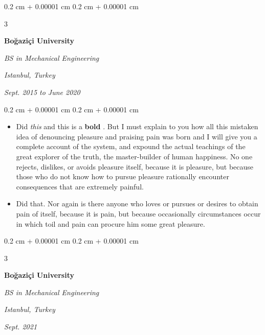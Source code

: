 \documentclass[10pt, letterpaper]{article}
\newenvironment{highlights}{
    \begin{itemize}[
        topsep=0.10 cm,
        parsep=0.10 cm,
        partopsep=0pt,
        itemsep=0pt,
        leftmargin=0.4 cm + 10pt + 0.6 cm
    ]
}{
    \end{itemize}
} %
\newenvironment{onecolentry}{
    \begin{adjustwidth}{
        0.2 cm + 0.00001 cm
    }{
        0.2 cm + 0.00001 cm
    }
}{
    \end{adjustwidth}
} %
\newenvironment{threecolentry}[3][]{
    \onecolentry
    \def\thirdColumn{#3}
    \setcolumnwidth{0.6 cm, \fill, 4.5 cm}
    \begin{paracol}{3}
    #2 \switchcolumn
}{
    \switchcolumn \raggedleft \thirdColumn
    \end{paracol}
    \endonecolentry
} %
\let\hrefWithoutArrow\href
\renewcommand{\href}[2]{\hrefWithoutArrow{#1}{\mbox{\ifthenelse{\equal{#2}{}}{ }{#2 }\raisebox{.15ex}{\footnotesize \faExternalLink*}}}}
\begin{document}
        \vspace{0.2 cm-3px}

        \begin{threecolentry}{
            \vspace*{\fill}
            \textbullet
            \vspace*{3px}
            \vspace*{\fill}
        }{
        \textit{Istanbul, Turkey}    
            
        \textit{Sept. 2015 to June 2020}}
            \textbf{Boğaziçi University}

            \textit{BS in Mechanical Engineering}
        \end{threecolentry}

        \vspace{0.10 cm-3px}
        \begin{onecolentry}
            \begin{highlights}
                \item Did \textit{this} and this is a \textbf{bold} \href{https://example.com}{link}. But I must explain to you how all this mistaken idea of denouncing pleasure and praising pain was born and I will give you a complete account of the system, and expound the actual teachings of the great explorer of the truth, the master-builder of human happiness. No one rejects, dislikes, or avoids pleasure itself, because it is pleasure, but because those who do not know how to pursue pleasure rationally encounter consequences that are extremely painful.
                \item Did that. Nor again is there anyone who loves or pursues or desires to obtain pain of itself, because it is pain, but because occasionally circumstances occur in which toil and pain can procure him some great pleasure.
            \end{highlights}
        \end{onecolentry}


        \vspace{0.2 cm-3px}

        \begin{threecolentry}{
            \vspace*{\fill}
            \textbullet
            \vspace*{3px}
            \vspace*{\fill}
        }{
        \textit{Istanbul, Turkey}    
            
        \textit{Sept. 2021}}
            \textbf{Boğaziçi University}

            \textit{BS in Mechanical Engineering}
        \end{threecolentry}
\end{document}
